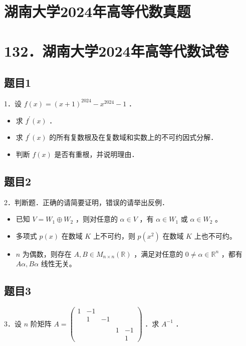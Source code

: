 \documentclass{article}
\begin{document}
\section*{湖南大学2024年高等代数真题}
\section*{132．湖南大学2024年高等代数试卷}

\subsection{题目1}
1．设 \(f(x)=(x+1)^{2024}-x^{2024}-1\) ．

\begin{itemize}
  \item[（1）] 求 \(f^{\prime}(x)\) ．
  \item[（2）] 求 \(f^{\prime}(x)\) 的所有复数根及在复数域和实数上的不可约因式分解．
  \item[（3）] 判断 \(f(x)\) 是否有重根，并说明理由．
\end{itemize}

\subsection{题目2}
2．判断题．正确的请简要证明，错误的请举出反例．

\begin{itemize}
  \item[（1）] 已知 \(V=W_{1} \oplus W_{2}\) ，则对任意的 \(\alpha \in V\) ，有 \(\alpha \in W_{1}\) 或 \(\alpha \in W_{2}\) 。
  \item[（2）] 多项式 \(p(x)\) 在数域 \(K\) 上不可约，则 \(p\left(x^{2}\right)\) 在数域 \(K\) 上也不可约。
  \item[（3）] \(n\) 为偶数，则存在 \(A, B \in M_{n \times n}(\mathbb{R})\) ，满足对任意的 \(0 \neq \alpha \in \mathbb{R}^{n}\) ，都有 \(A \alpha, B \alpha\) 线性无关。
\end{itemize}

\subsection{题目3}
3．设 \(n\) 阶矩阵 \(A=\left(\begin{array}{rrrrr}1 & -1 & & & \\ & 1 & -1 & & \\ & & & \\ & & & 1 & -1 \\ & & & & 1\end{array}\right)\) ．求 \(A^{-1}\) ．
\end{document}
